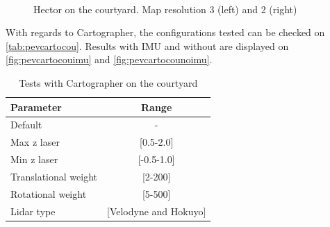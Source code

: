 \begin{figure}[t!]
   \\ 
  \caption[Hector on the courtyard]{Hector on the courtyard. Map resolution 3 (left) and 2 (right)}
  \label{fig:pevhecouvar}
\end{figure}

 With regards to Cartographer, the configurations tested can be checked on \autoref{tab:pevcartocou}. Results with IMU and without are displayed on \autoref{fig:pevcartocouimu} and \autoref{fig:pevcartocounoimu}.
\begin{table}[t!]
  \centering
  \begin{tabular}{lc}
    \hline
    \textbf{Parameter} & \textbf{Range} \\ \hline
    Default & - \\ \hline
    Max z laser & {[}0.5-2.0{]} \\ \hline
    Min z laser & {[}-0.5-1.0{]} \\ \hline
    Translational weight & {[}2-200{]} \\ \hline
    Rotational weight & {[}5-500{]} \\ \hline
    Lidar type & {[}Velodyne and Hokuyo{]} \\ \hline
  \end{tabular}
  \caption{Tests with Cartographer on the courtyard}
  \label{tab:pevcartocou}
\end{table}

